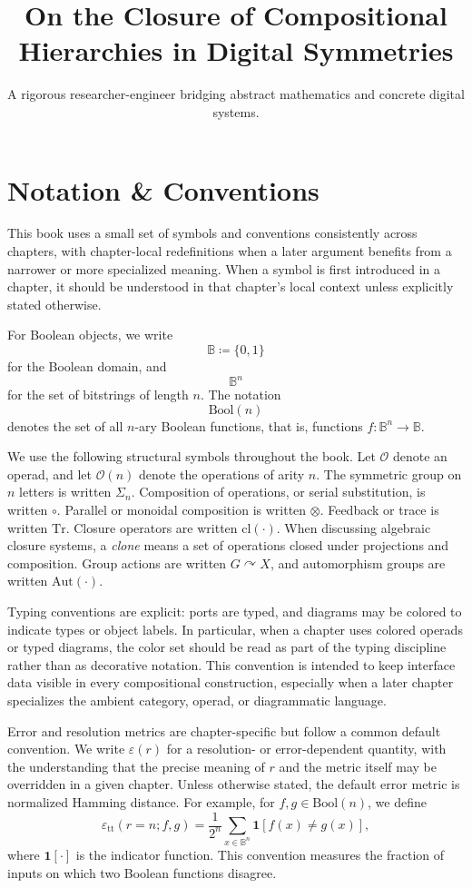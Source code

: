 \documentclass[11pt]{article}
\title{On the Closure of Compositional Hierarchies in Digital Symmetries}
\author{A rigorous researcher-engineer bridging abstract mathematics and concrete digital systems.}
\begin{document}
\section*{Notation \& Conventions}

This book uses a small set of symbols and conventions consistently across chapters, with chapter-local redefinitions when a later argument benefits from a narrower or more specialized meaning. When a symbol is first introduced in a chapter, it should be understood in that chapter's local context unless explicitly stated otherwise.

For Boolean objects, we write
\[
\mathbb{B} \coloneqq \{0,1\}
\]
for the Boolean domain, and
\[
\mathbb{B}^n
\]
for the set of bitstrings of length $n$. The notation
\[
\mathrm{Bool}(n)
\]
denotes the set of all $n$-ary Boolean functions, that is, functions $f : \mathbb{B}^n \to \mathbb{B}$.

We use the following structural symbols throughout the book. Let $\mathcal{O}$ denote an operad, and let $\mathcal{O}(n)$ denote the operations of arity $n$. The symmetric group on $n$ letters is written $\Sigma_n$. Composition of operations, or serial substitution, is written $\circ$. Parallel or monoidal composition is written $\otimes$. Feedback or trace is written $\mathrm{Tr}$. Closure operators are written $\mathrm{cl}(\cdot)$. When discussing algebraic closure systems, a \emph{clone} means a set of operations closed under projections and composition. Group actions are written $G \curvearrowright X$, and automorphism groups are written $\mathrm{Aut}(\cdot)$.

Typing conventions are explicit: ports are typed, and diagrams may be colored to indicate types or object labels. In particular, when a chapter uses colored operads or typed diagrams, the color set should be read as part of the typing discipline rather than as decorative notation. This convention is intended to keep interface data visible in every compositional construction, especially when a later chapter specializes the ambient category, operad, or diagrammatic language.

Error and resolution metrics are chapter-specific but follow a common default convention. We write $\varepsilon(r)$ for a resolution- or error-dependent quantity, with the understanding that the precise meaning of $r$ and the metric itself may be overridden in a given chapter. Unless otherwise stated, the default error metric is normalized Hamming distance. For example, for $f,g \in \mathrm{Bool}(n)$, we define
\[
\varepsilon_{\mathrm{tt}}(r=n; f,g) = \frac{1}{2^n} \sum_{x \in \mathbb{B}^n} \mathbf{1}[f(x) \neq g(x)] ,
\]
where $\mathbf{1}[\cdot]$ is the indicator function. This convention measures the fraction of inputs on which two Boolean functions disagree.
\end{document}
